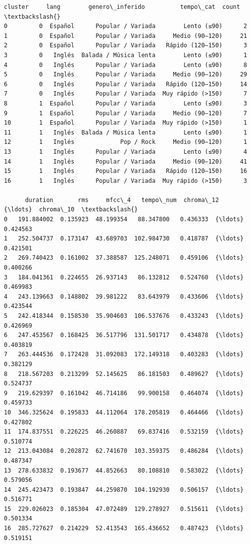 \documentclass[11pt]{article}
\makeatletter
\newcommand{\boxspacing}{\kern\kvtcb@left@rule\kern\kvtcb@boxsep}
\newcommand{\prompt}[4]{
        {\ttfamily\llap{{\color{#2}[#3]:\hspace{3pt}#4}}\vspace{-\baselineskip}}
    }
\makeatother
\begin{document}
            \begin{tcolorbox}[breakable, size=fbox, boxrule=.5pt, pad at break*=1mm, opacityfill=0]
\prompt{Out}{outcolor}{60}{\boxspacing}
\begin{Verbatim}[commandchars=\\\{\}]
    cluster     lang        genero\_inferido          tempo\_cat  count  \textbackslash{}
0         0  Español      Popular / Variada        Lento (≤90)      2
1         0  Español      Popular / Variada     Medio (90–120)     21
2         0  Español      Popular / Variada   Rápido (120–150)      3
3         0   Inglés  Balada / Música lenta        Lento (≤90)      1
4         0   Inglés      Popular / Variada        Lento (≤90)      8
5         0   Inglés      Popular / Variada     Medio (90–120)     29
6         0   Inglés      Popular / Variada   Rápido (120–150)     14
7         0   Inglés      Popular / Variada  Muy rápido (>150)      7
8         1  Español      Popular / Variada        Lento (≤90)      3
9         1  Español      Popular / Variada     Medio (90–120)      7
10        1  Español      Popular / Variada  Muy rápido (>150)      1
11        1   Inglés  Balada / Música lenta        Lento (≤90)      1
12        1   Inglés             Pop / Rock     Medio (90–120)      1
13        1   Inglés      Popular / Variada        Lento (≤90)      4
14        1   Inglés      Popular / Variada     Medio (90–120)     41
15        1   Inglés      Popular / Variada   Rápido (120–150)     16
16        1   Inglés      Popular / Variada  Muy rápido (>150)      3

      duration       rms     mfcc\_4   tempo\_num  chroma\_12  {\ldots}  chroma\_10  \textbackslash{}
0   191.884002  0.135923  48.199354   88.347800   0.436333  {\ldots}   0.424563
1   252.504737  0.173147  43.689703  102.984730   0.418787  {\ldots}   0.421501
2   269.740423  0.161002  37.388587  125.248071   0.459106  {\ldots}   0.400266
3   184.041361  0.224655  26.937143   86.132812   0.524760  {\ldots}   0.469983
4   243.139663  0.148802  39.981222   83.643979   0.433606  {\ldots}   0.423544
5   242.418344  0.158530  35.904603  106.537676   0.433243  {\ldots}   0.426969
6   247.453567  0.168425  36.517796  131.501717   0.434878  {\ldots}   0.403819
7   263.444536  0.172428  31.092083  172.149318   0.403283  {\ldots}   0.382129
8   218.567203  0.213299  52.145625   86.181503   0.489627  {\ldots}   0.524737
9   219.629397  0.161042  46.714186   99.900158   0.464074  {\ldots}   0.459733
10  346.325624  0.195833  44.112064  178.205819   0.464466  {\ldots}   0.427802
11  174.837551  0.226225  46.260887   69.837416   0.532159  {\ldots}   0.510774
12  213.043084  0.202872  62.741670  103.359375   0.486284  {\ldots}   0.487347
13  278.633832  0.193677  44.852663   80.108810   0.583022  {\ldots}   0.579056
14  245.423473  0.193847  44.259870  104.192930   0.506157  {\ldots}   0.516771
15  229.026023  0.185304  47.072489  129.278927   0.515611  {\ldots}   0.501334
16  285.727627  0.214229  52.413543  165.436652   0.487423  {\ldots}   0.519151


\end{Verbatim}
\end{tcolorbox}
\end{document}
